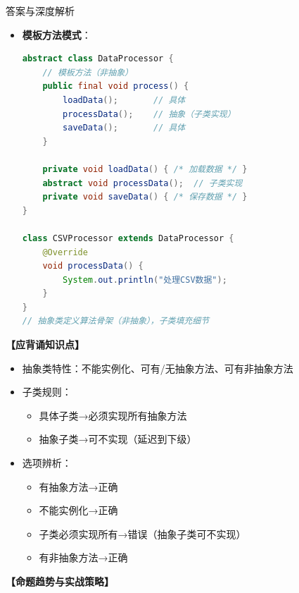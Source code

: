 \documentclass[12pt, a4paper]{ctexart}
\begin{document}
\begin{enumerate}[label=\textbf{\arabic*.}]
\begin{bluebox}{答案与深度解析}
\begin{itemize}[leftmargin=*, nosep, label={}]
\begin{itemize}[label={}, leftmargin=*, nosep]
\begin{lstlisting}[language=Java]
    @Override
    void makeSound() {
        System.out.println(name + " 喵喵叫");
        sleep();  // 调用继承的非抽象方法
    }
}
// 抽象类可包含构造方法、实例方法、静态方法
				      \end{lstlisting}
				            \item \textbf{模板方法模式}：
				                  \begin{lstlisting}[language=Java]
abstract class DataProcessor {
    // 模板方法（非抽象）
    public final void process() {
        loadData();       // 具体
        processData();    // 抽象（子类实现）
        saveData();       // 具体
    }

    private void loadData() { /* 加载数据 */ }
    abstract void processData();  // 子类实现
    private void saveData() { /* 保存数据 */ }
}

class CSVProcessor extends DataProcessor {
    @Override
    void processData() {
        System.out.println("处理CSV数据");
    }
}
// 抽象类定义算法骨架（非抽象），子类填充细节
				      \end{lstlisting}
			            \end{itemize}
		      \end{itemize}

		      \textbf{【应背诵知识点】}
		      \begin{itemize}[label={}, nosep]
			      \item 抽象类特性：不能实例化、可有/无抽象方法、可有非抽象方法
			      \item 子类规则：
			            \begin{itemize}[label={}, nosep]
				            \item 具体子类→必须实现所有抽象方法
				            \item 抽象子类→可不实现（延迟到下级）
			            \end{itemize}
			      \item 选项辨析：
			            \begin{itemize}[label={}, nosep]
				            \item 有抽象方法→正确
				            \item 不能实例化→正确
				            \item 子类必须实现所有→错误（抽象子类可不实现）
				            \item 有非抽象方法→正确
			            \end{itemize}
		      \end{itemize}

		      \textbf{【命题趋势与实战策略】}


\end{bluebox}
\end{enumerate}
\end{document}
